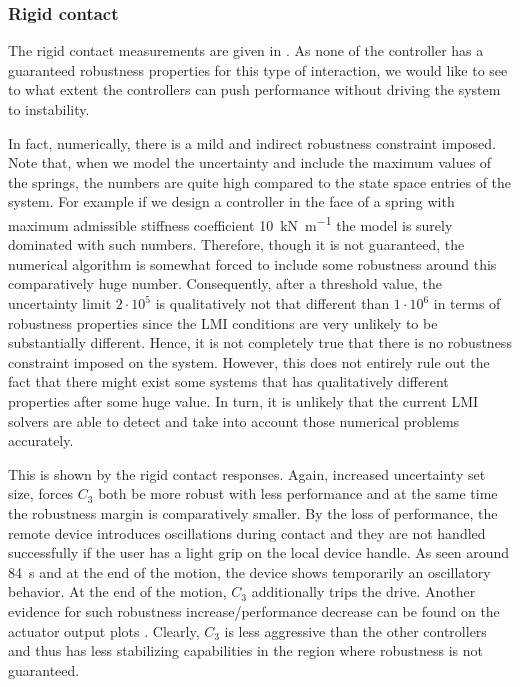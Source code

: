 \subsubsection{Rigid contact}

The rigid contact measurements are given in . As none 
of the controller has a guaranteed robustness properties for this type of interaction, we would like to see to what extent the
controllers can push performance without driving the system to instability. 

In fact, numerically, there is a mild and indirect robustness constraint imposed. Note that, when we model the uncertainty and 
include the maximum values of the springs, the numbers are quite high compared to the state space entries of the system. For example
if we design a controller in the face of a spring with maximum admissible stiffness coefficient \SI{10}{\kilo\newton\per\meter} the
model is surely dominated with such numbers. Therefore, though it is not guaranteed, the numerical algorithm is somewhat forced to 
include some robustness around this comparatively huge number. Consequently, after a threshold value, the uncertainty limit 
$2\cdot 10^5$ is qualitatively not that different than $1\cdot 10^6$ in terms of robustness properties since the LMI conditions
are very unlikely to be substantially different. Hence, it is not completely true that there is no robustness constraint imposed 
on the system. However, this does not entirely rule out the fact that there might exist some systems that has qualitatively 
different properties after some huge value. In turn, it is unlikely that the current LMI solvers are able to detect and take into 
account those numerical problems accurately. 

This is shown by the rigid contact responses. Again, increased uncertainty set size, forces $C_3$ both be more robust with less
performance and at the same time the robustness margin is comparatively smaller. By the loss of performance, the remote device 
introduces oscillations during contact and they are not handled successfully if the user has a light grip on the local device handle.
As seen around \SI{84}{\second} and at the end of the motion, the device shows temporarily an oscillatory behavior. At the end of the 
motion, $C_3$ additionally trips the drive. Another evidence for such robustness increase/performance decrease can be found on the actuator output
plots . Clearly, $C_3$ is less aggressive than 
the other controllers and thus has less stabilizing capabilities in the region where robustness is not guaranteed. 

